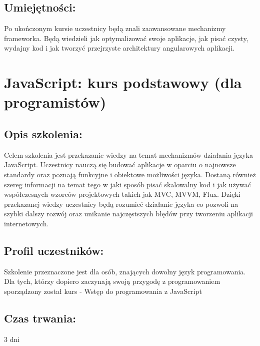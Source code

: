 \documentclass{article}[10pt]
\begin{document}
	\subsection*{Umiejętności:}
\begin{adjustwidth}{2cm}{}
\justifying
	
Po ukończonym kursie uczestnicy będą znali zaawansowane mechanizmy frameworka. Będą wiedzieli jak optymalizować swoje aplikacje, jak pisać czysty, wydajny kod i jak tworzyć przejrzyste architektury angularowych aplikacji.



\end{adjustwidth}

\newpage


    
	\section{JavaScript: kurs podstawowy (dla programistów)}

	\subsection*{Opis szkolenia:}
	\begin{adjustwidth}{2cm}{}
\justifying
		Celem szkolenia jest przekazanie wiedzy na temat mechanizmów działania języka JavaScript.
Uczestnicy nauczą się budować aplikacje w oparciu o najnowsze standardy oraz poznają funkcyjne i obiektowe możliwości języka. Dostaną również szereg informacji na temat tego w jaki sposób pisać skalowalny kod i jak używać współczesnych wzorców projektowych takich jak
MVC, MVVM, Flux. Dzięki przekazanej wiedzy uczestnicy będą rozumieć działanie języka co pozwoli na szybki dalszy rozwój oraz unikanie najczęstszych błędów przy tworzeniu aplikacji internetowych.
	\end{adjustwidth}
	\subsection*{Profil uczestników:}
\begin{adjustwidth}{2cm}{}
\justifying
	
Szkolenie przeznaczone jest dla osób, znających dowolny język programowania. Dla tych, którzy dopiero zaczynają swoją przygodę z programowaniem sporządzony został kurs - Wstęp do programowania z JavaScript

\end{adjustwidth}
	\subsection*{Czas trwania:}
\begin{adjustwidth}{2cm}{}
	3 dni
\end{adjustwidth}
\end{document}
